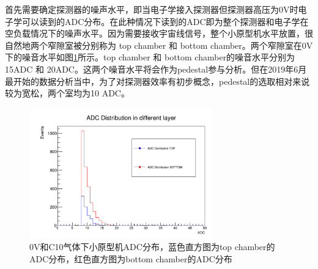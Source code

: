 首先需要确定探测器的噪声水平，即当电子学接入探测器但探测器高压为0V时电子学可以读到的ADC分布。在此种情况下读到的ADC即为整个探测器和电子学在空负载情况下的噪声水平。因为需要接收宇宙线信号，整个小原型机水平放置，很自然地两个窄隙室被分别称为 top chamber 和 bottom chamber。两个窄隙室在0V下的噪音水平如图\ref{fig:ADC_Distribution_0V}所示。top chamber 和 bottom chamber的噪音水平分别为15ADC 和 20ADC。这两个噪音水平将会作为pedestal参与分析。但在2019年6月最开始的数据分析当中，为了对探测器效率有初步概念，pedestal的选取相对来说较为宽松，两个室均为10 ADC。
\begin{figure}[htb]
    \begin{center}
    \includegraphics[width=0.7\textwidth,clip]{figures/Chapter3/ADC_Distribution_0V.png}
    \end{center}
    \caption[0V和C10气体下小原型机ADC分布]{0V和C10气体下小原型机ADC分布，蓝色直方图为top chamber的ADC分布，红色直方图为bottom chamber的ADC分布}
    \label{fig:ADC_Distribution_0V}
\end{figure}

